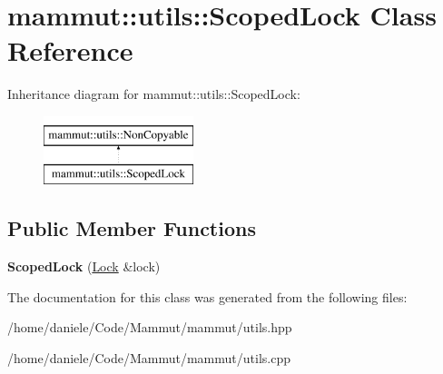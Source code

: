 \hypertarget{classmammut_1_1utils_1_1ScopedLock}{\section{mammut\-:\-:utils\-:\-:Scoped\-Lock Class Reference}
\label{classmammut_1_1utils_1_1ScopedLock}
}
Inheritance diagram for mammut\-:\-:utils\-:\-:Scoped\-Lock\-:\begin{figure}[H]
\begin{center}
\leavevmode
\includegraphics[height=2.000000cm]{classmammut_1_1utils_1_1ScopedLock}
\end{center}
\end{figure}
\subsection*{Public Member Functions}
\begin{DoxyCompactItemize}
\item 
\hypertarget{classmammut_1_1utils_1_1ScopedLock_a13934c56c0e4b3c54e35a01accec0ffe}{{\bfseries Scoped\-Lock} (\hyperlink{classmammut_1_1utils_1_1Lock}{Lock} \&lock)}\label{classmammut_1_1utils_1_1ScopedLock_a13934c56c0e4b3c54e35a01accec0ffe}

\end{DoxyCompactItemize}


The documentation for this class was generated from the following files\-:\begin{DoxyCompactItemize}
\item 
/home/daniele/\-Code/\-Mammut/mammut/utils.\-hpp\item 
/home/daniele/\-Code/\-Mammut/mammut/utils.\-cpp\end{DoxyCompactItemize}
